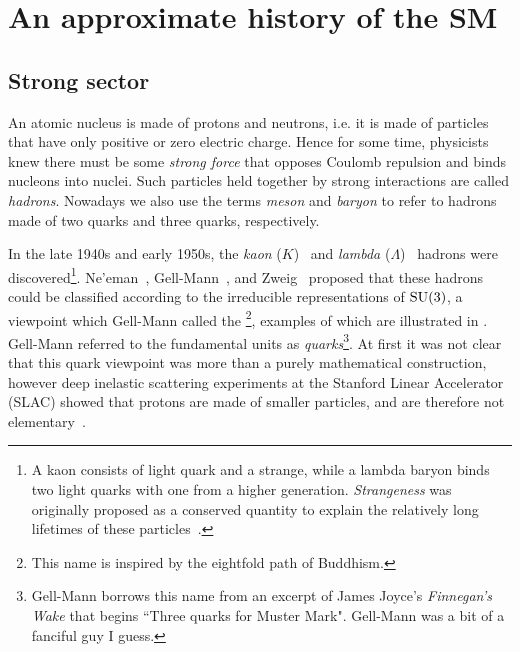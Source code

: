 \section{An approximate history of the SM}

%


\subsection{Strong sector}

An atomic nucleus is made of protons and neutrons, i.e. it is made of particles
that have only positive or zero electric charge. Hence for some time, physicists
knew there must be some {\it strong force} that opposes
Coulomb repulsion and binds nucleons into nuclei.
Such particles held together by strong interactions are called
{\it hadrons}. Nowadays we also use the terms {\it meson}
 and {\it baryon} to refer to hadrons made of 
two quarks and three quarks, respectively.

In the late 1940s and early 1950s, the {\it kaon} ($K$)~\cite{rochester_evidence_1947}
 and {\it lambda} ($\Lambda$)~\cite{hopper_evidence_1950} 
hadrons were discovered\footnote{A kaon
consists of light quark and a strange, while a lambda baryon binds two light
quarks with one from a higher generation. {\it Strangeness} was originally
proposed as a conserved quantity to explain the relatively long
lifetimes of these particles~\cite{pais_remarks_1952,gell-mann_isotopic_1953,
pais_baryon-meson-photon_1953,tadao_charge_1953}.}.
Ne'eman~\cite{neeman_derivation_1961}, 
Gell-Mann~\cite{gell-mann_symmetries_1962}, and 
Zweig~\cite{zweig_su3_1964} proposed that these hadrons could be classified
according to the irreducible representations of $\operatorname{SU}(3)$, a viewpoint which
Gell-Mann called the \footnote{This
name is inspired by the eightfold path of Buddhism.}, examples of which are 
illustrated in . Gell-Mann
referred to the fundamental units as {\it quarks}\footnote{Gell-Mann borrows
this name from an excerpt of James Joyce's {\it Finnegan's Wake} that begins
``Three quarks for Muster Mark".
Gell-Mann was a bit of a fanciful guy I guess.}.
At first it was not clear that this quark viewpoint was more than a
purely mathematical construction, however deep inelastic 
scattering
experiments at the Stanford Linear Accelerator (SLAC) showed that
protons are made of smaller particles, and are therefore not 
elementary~\cite{bloom_high-energy_1969,breidenbach_observed_1969}.

